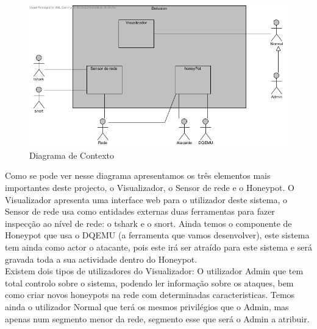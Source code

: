 \begin{figure}[!ht]
\centering
\includegraphics[scale=0.8]{images/DiagramaContexto}
\caption{Diagrama de Contexto}
\label{fig:dcont}
\end{figure}

Como se pode ver nesse diagrama apresentamos os três elementos mais importantes deste projecto, o Visualizador, o Sensor de rede e o Honeypot.
O Visualizador apresenta uma interface web para o utilizador deste sistema, o Sensor de rede usa como entidades externas duas ferramentas para fazer inspecção
ao nível de rede: o tshark e o snort. Ainda temos o componente de Honeypot que usa o DQEMU (a ferramenta que vamos desenvolver), este sistema tem ainda
como actor o atacante, pois este irá ser atraído para este sistema e será gravada toda a sua actividade dentro do Honeypot.\\
Existem dois tipos de utilizadores do Visualizador: O utilizador Admin que tem total controlo sobre o sistema, podendo ler informação sobre os ataques, bem como
criar novos honeypots na rede com determinadas caracteristicas. Temos ainda o utilizador Normal que terá os mesmos privilégios que o Admin, mas apenas num
segmento menor da rede, segmento esse que será o Admin a atribuir.


